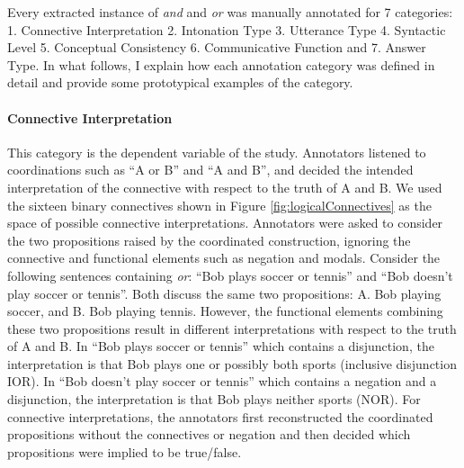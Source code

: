 \documentclass[oneside]{report}
\theoremstyle{definition}
\theoremstyle{definition}
\theoremstyle{definition}
\theoremstyle{remark}
\begin{document}
Every extracted instance of \emph{and} and \emph{or} was manually
annotated for 7 categories: 1. Connective Interpretation 2. Intonation
Type 3. Utterance Type 4. Syntactic Level 5. Conceptual Consistency 6.
Communicative Function and 7. Answer Type. In what follows, I explain
how each annotation category was defined in detail and provide some
prototypical examples of the category.

\paragraph{Connective Interpretation}\label{connective-interpretation}

This category is the dependent variable of the study. Annotators
listened to coordinations such as ``A or B'' and ``A and B'', and
decided the intended interpretation of the connective with respect to
the truth of A and B. We used the sixteen binary connectives shown in
Figure \ref{fig:logicalConnectives} as the space of possible connective
interpretations. Annotators were asked to consider the two propositions
raised by the coordinated construction, ignoring the connective and
functional elements such as negation and modals. Consider the following
sentences containing \emph{or}: ``Bob plays soccer or tennis'' and ``Bob
doesn't play soccer or tennis''. Both discuss the same two propositions:
A. Bob playing soccer, and B. Bob playing tennis. However, the
functional elements combining these two propositions result in different
interpretations with respect to the truth of A and B. In ``Bob plays
soccer or tennis'' which contains a disjunction, the interpretation is
that Bob plays one or possibly both sports (inclusive disjunction IOR).
In ``Bob doesn't play soccer or tennis'' which contains a negation and a
disjunction, the interpretation is that Bob plays neither sports (NOR).
For connective interpretations, the annotators first reconstructed the
coordinated propositions without the connectives or negation and then
decided which propositions were implied to be true/false.
\end{document}

